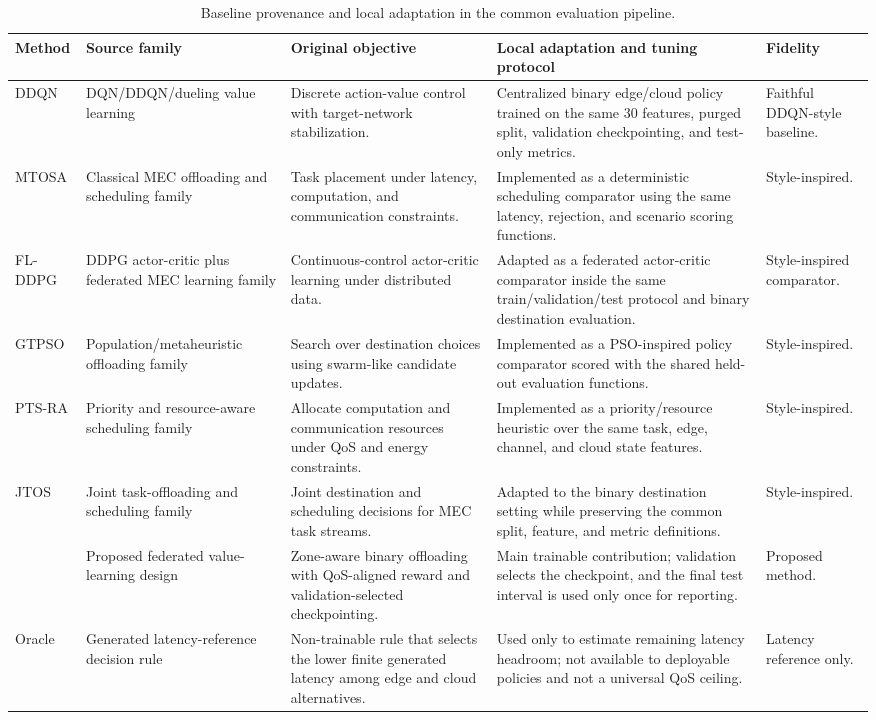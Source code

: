\begin{table}[!t]
\centering
\caption{Baseline provenance and local adaptation in the common evaluation pipeline.}
\label{tab:baselines}
\scriptsize
\renewcommand{\arraystretch}{1.08}
\begin{tabularx}{\textwidth}{@{}p{}p{}p{}X p{}@{}}
\toprule
Method & Source family & Original objective & Local adaptation and tuning protocol & Fidelity \\
\midrule
DDQN & DQN/DDQN/dueling value learning \cite{ref35,ref36,ref41} & Discrete action-value control with target-network stabilization. & Centralized binary edge/cloud policy trained on the same 30 features, purged split, validation checkpointing, and test-only metrics. & Faithful DDQN-style baseline. \\
MTOSA & Classical MEC offloading and scheduling family \cite{ref17,ref24,ref28} & Task placement under latency, computation, and communication constraints. & Implemented as a deterministic scheduling comparator using the same latency, rejection, and scenario scoring functions. & Style-inspired. \\
FL-DDPG & DDPG actor-critic plus federated MEC learning family \cite{ref02,ref04,ref05,ref38} & Continuous-control actor-critic learning under distributed data. & Adapted as a federated actor-critic comparator inside the same train/validation/test protocol and binary destination evaluation. & Style-inspired comparator. \\
GTPSO & Population/metaheuristic offloading family \cite{ref28} & Search over destination choices using swarm-like candidate updates. & Implemented as a PSO-inspired policy comparator scored with the shared held-out evaluation functions. & Style-inspired. \\
PTS-RA & Priority and resource-aware scheduling family \cite{ref18,ref19} & Allocate computation and communication resources under QoS and energy constraints. & Implemented as a priority/resource heuristic over the same task, edge, channel, and cloud state features. & Style-inspired. \\
JTOS & Joint task-offloading and scheduling family \cite{ref03,ref07,ref12} & Joint destination and scheduling decisions for MEC task streams. & Adapted to the binary destination setting while preserving the common split, feature, and metric definitions. & Style-inspired. \\
\fedddqn{} & Proposed federated value-learning design \cite{ref30,ref31,ref32,ref36,ref41} & Zone-aware binary offloading with QoS-aligned reward and validation-selected checkpointing. & Main trainable contribution; validation selects the checkpoint, and the final test interval is used only once for reporting. & Proposed method. \\
Oracle & Generated latency-reference decision rule & Non-trainable rule that selects the lower finite generated latency among edge and cloud alternatives. & Used only to estimate remaining latency headroom; not available to deployable policies and not a universal QoS ceiling. & Latency reference only. \\
\bottomrule
\end{tabularx}
\end{table}
